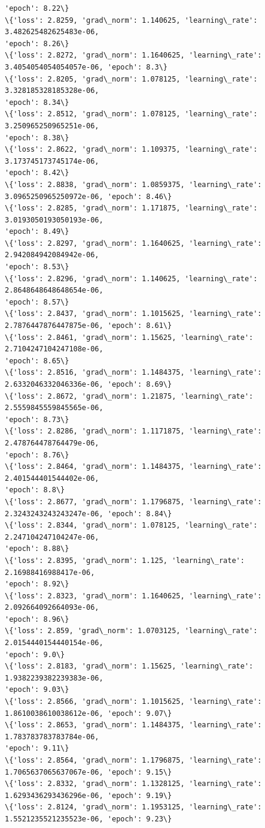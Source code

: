 \documentclass[11pt]{article}
\begin{document}
\begin{Verbatim}[commandchars=\\\{\}]
'epoch': 8.22\}
\{'loss': 2.8259, 'grad\_norm': 1.140625, 'learning\_rate': 3.482625482625483e-06,
'epoch': 8.26\}
\{'loss': 2.8272, 'grad\_norm': 1.1640625, 'learning\_rate':
3.4054054054054057e-06, 'epoch': 8.3\}
\{'loss': 2.8205, 'grad\_norm': 1.078125, 'learning\_rate': 3.328185328185328e-06,
'epoch': 8.34\}
\{'loss': 2.8512, 'grad\_norm': 1.078125, 'learning\_rate': 3.250965250965251e-06,
'epoch': 8.38\}
\{'loss': 2.8622, 'grad\_norm': 1.109375, 'learning\_rate': 3.173745173745174e-06,
'epoch': 8.42\}
\{'loss': 2.8838, 'grad\_norm': 1.0859375, 'learning\_rate':
3.0965250965250972e-06, 'epoch': 8.46\}
\{'loss': 2.8285, 'grad\_norm': 1.171875, 'learning\_rate': 3.0193050193050193e-06,
'epoch': 8.49\}
\{'loss': 2.8297, 'grad\_norm': 1.1640625, 'learning\_rate': 2.942084942084942e-06,
'epoch': 8.53\}
\{'loss': 2.8296, 'grad\_norm': 1.140625, 'learning\_rate': 2.8648648648648654e-06,
'epoch': 8.57\}
\{'loss': 2.8437, 'grad\_norm': 1.1015625, 'learning\_rate':
2.7876447876447875e-06, 'epoch': 8.61\}
\{'loss': 2.8461, 'grad\_norm': 1.15625, 'learning\_rate': 2.7104247104247108e-06,
'epoch': 8.65\}
\{'loss': 2.8516, 'grad\_norm': 1.1484375, 'learning\_rate':
2.6332046332046336e-06, 'epoch': 8.69\}
\{'loss': 2.8672, 'grad\_norm': 1.21875, 'learning\_rate': 2.5559845559845565e-06,
'epoch': 8.73\}
\{'loss': 2.8286, 'grad\_norm': 1.1171875, 'learning\_rate': 2.478764478764479e-06,
'epoch': 8.76\}
\{'loss': 2.8464, 'grad\_norm': 1.1484375, 'learning\_rate': 2.401544401544402e-06,
'epoch': 8.8\}
\{'loss': 2.8677, 'grad\_norm': 1.1796875, 'learning\_rate':
2.3243243243243247e-06, 'epoch': 8.84\}
\{'loss': 2.8344, 'grad\_norm': 1.078125, 'learning\_rate': 2.247104247104247e-06,
'epoch': 8.88\}
\{'loss': 2.8395, 'grad\_norm': 1.125, 'learning\_rate': 2.16988416988417e-06,
'epoch': 8.92\}
\{'loss': 2.8323, 'grad\_norm': 1.1640625, 'learning\_rate': 2.092664092664093e-06,
'epoch': 8.96\}
\{'loss': 2.859, 'grad\_norm': 1.0703125, 'learning\_rate': 2.0154440154440154e-06,
'epoch': 9.0\}
\{'loss': 2.8183, 'grad\_norm': 1.15625, 'learning\_rate': 1.9382239382239383e-06,
'epoch': 9.03\}
\{'loss': 2.8566, 'grad\_norm': 1.1015625, 'learning\_rate':
1.8610038610038612e-06, 'epoch': 9.07\}
\{'loss': 2.8653, 'grad\_norm': 1.1484375, 'learning\_rate': 1.783783783783784e-06,
'epoch': 9.11\}
\{'loss': 2.8564, 'grad\_norm': 1.1796875, 'learning\_rate':
1.7065637065637067e-06, 'epoch': 9.15\}
\{'loss': 2.8332, 'grad\_norm': 1.1328125, 'learning\_rate':
1.6293436293436296e-06, 'epoch': 9.19\}
\{'loss': 2.8124, 'grad\_norm': 1.1953125, 'learning\_rate':
1.5521235521235523e-06, 'epoch': 9.23\}

\end{Verbatim}
\end{document}
